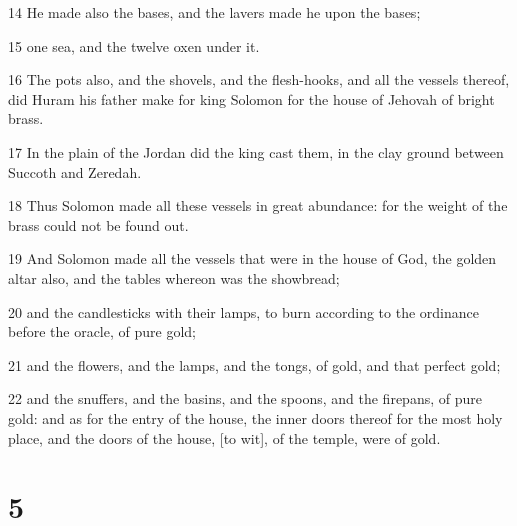 \par 14 He made also the bases, and the lavers made he upon the bases;
\par 15 one sea, and the twelve oxen under it.
\par 16 The pots also, and the shovels, and the flesh-hooks, and all the vessels thereof, did Huram his father make for king Solomon for the house of Jehovah of bright brass.
\par 17 In the plain of the Jordan did the king cast them, in the clay ground between Succoth and Zeredah.
\par 18 Thus Solomon made all these vessels in great abundance: for the weight of the brass could not be found out.
\par 19 And Solomon made all the vessels that were in the house of God, the golden altar also, and the tables whereon was the showbread;
\par 20 and the candlesticks with their lamps, to burn according to the ordinance before the oracle, of pure gold;
\par 21 and the flowers, and the lamps, and the tongs, of gold, and that perfect gold;
\par 22 and the snuffers, and the basins, and the spoons, and the firepans, of pure gold: and as for the entry of the house, the inner doors thereof for the most holy place, and the doors of the house, [to wit], of the temple, were of gold.

\chapter{5}

